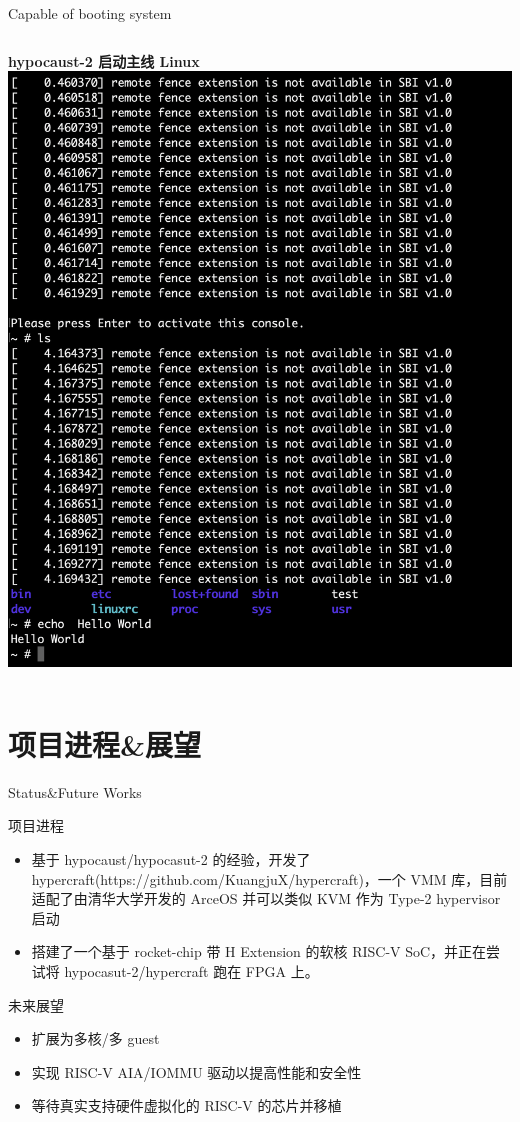 \documentclass{beamer}
\begin{document}
\begin{frame}{Capable of booting system}
\begin{columns}
        \begin{column}{0.5\textwidth}
            \centering
            \textbf{hypocaust-2 启动主线 Linux}
            \includegraphics[width=\linewidth]{pic/hypocaust-2-linux.png}          
        \end{column}
      \end{columns}
  \end{frame}

  \section{项目进程\&展望}

  \begin{frame}{Status\&Future Works}
      \item 项目进程
      \begin{itemize}
          \item 基于 hypocaust/hypocasut-2 的经验，开发了 hypercraft(https://github.com/KuangjuX/hypercraft)，一个 VMM 库，目前适配了由清华大学开发的 ArceOS 并可以类似 KVM 作为 Type-2 hypervisor 启动
          \item 搭建了一个基于 rocket-chip 带 H Extension 的软核 RISC-V SoC，并正在尝试将 hypocasut-2/hypercraft 跑在 FPGA 上。
      \end{itemize}
      \item 未来展望
      \begin{itemize}
          \item 扩展为多核/多 guest
          \item 实现 RISC-V AIA/IOMMU 驱动以提高性能和安全性
          \item 等待真实支持硬件虚拟化的 RISC-V 的芯片并移植
      \end{itemize}
  \end{frame}
\end{document}
